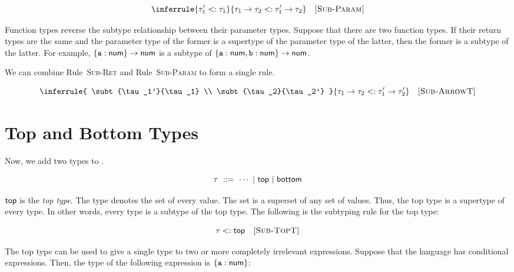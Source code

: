 \vspace{-1em}

\[
  \inferrule
  { \subt{\tau_1'}{\tau_1} }
  { \subt{\tarrow{\tau_1}{\tau_2}}{\tarrow{\tau_1'}{\tau_2}} }
  \quad\textsc{[Sub-Param]}
\]

Function types reverse the subtype relationship between their parameter types.
Suppose that there are two function types. If their return types are the same
and the parameter type of the former is a supertype of the parameter type of the latter, then
the former is a subtype of the latter.
For example, $\{\texttt{a}:\textsf{num}\}\rightarrow\textsf{num}$
is a subtype of $\{\texttt{a}:\textsf{num},\texttt{b}:\textsf{num}\}\rightarrow\textsf{num}$.

We can combine Rule~\textsc{Sub-Ret} and Rule~\textsc{Sub-Param} to form a
single rule.


\vspace{-1em}

\[
  \inferrule
  { \subt{\tau_1'}{\tau_1} \\
    \subt{\tau_2}{\tau_2'} }
  { \subt{\tarrow{\tau_1}{\tau_2}}{\tarrow{\tau_1'}{\tau_2'}} }
  \quad\textsc{[Sub-ArrowT]}
\]

\section{Top and Bottom Types}

Now, we add two types to \Lang.

\[ \tau \ ::= \ \cdots \ |\ \ttop \ |\ \tbot \]

$\textsf{top}$ is the \textit{top type}. The type denotes the set of
every value. The set is a superset of any set of values. Thus, the top type is a
supertype of every type. In other words, every type is a subtype of the top
type. The following is the subtyping rule for the top type:


\[
  \tau<:\textsf{top}
  \quad\textsc{[Sub-TopT]}
\]

The top type can be used to give a single type to two or more completely
irrelevant expressions. Suppose that the language has conditional expressions.
Then, the type of the following expression is $\{\texttt{a}:\textsf{num}\}$:

